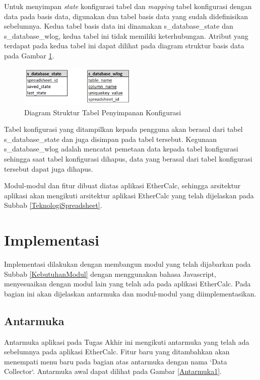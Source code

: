 	Untuk menyimpan \textit{state} konfigurasi tabel dan \textit{mapping} tabel konfigurasi dengan data pada basis data, digunakan dua tabel basis data yang sudah didefinisikan sebelumnya. Kedua tabel basis data ini dinamakan s\_database\_state dan s\_database\_wlog, kedua tabel ini tidak memiliki keterhubungan. Atribut yang terdapat pada kedua tabel ini dapat dilihat pada diagram struktur basis data pada Gambar \ref{StructureDiagram}.

	\begin{figure}[htb]
	    \centering
	    \includegraphics[width=0.5\textwidth]{resources/chapter-4-architect-db.png}
	    \caption{Diagram Struktur Tabel Penyimpanan Konfigurasi}
		\label{StructureDiagram}
	\end{figure}

	Tabel konfigurasi yang ditampilkan kepada pengguna akan berasal dari tabel s\_database\_state dan juga disimpan pada tabel tersebut. Kegunaan  s\_database\_wlog adalah mencatat pemetaan data kepada tabel konfigurasi sehingga saat tabel konfigurasi dihapus, data yang berasal dari tabel konfigurasi tersebut dapat juga dihapus.

	Modul-modul dan fitur dibuat diatas aplikasi EtherCalc, sehingga arsitektur aplikasi akan mengikuti arsitektur aplikasi EtherCalc yang telah dijelaskan pada Subbab \ref{TeknologiSpreadsheet}.

\section{Implementasi}
Implementasi dilakukan dengan membangun modul yang telah dijabarkan pada Subbab \ref{KebutuhanModul} dengan menggunakan bahasa Javascript, menyesuaikan dengan modul lain yang telah ada pada aplikasi EtherCalc. Pada bagian ini akan dijelaskan antarmuka dan modul-modul yang diimplementasikan.
	\subsection{Antarmuka}
	Antarmuka aplikasi pada Tugas Akhir ini mengikuti antarmuka yang telah ada sebelumnya pada aplikasi EtherCalc. Fitur baru yang ditambahkan akan menempati menu baru pada bagian atas antarmuka dengan nama `Data Collector`. Antarmuka awal dapat dilihat pada Gambar \ref{Antarmuka1}.


